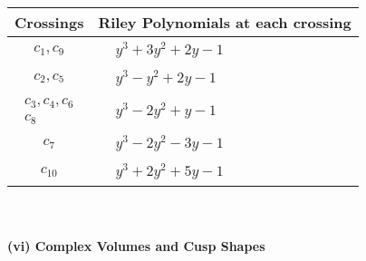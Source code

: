 \documentclass[1p]{elsarticle_modified}
\theoremstyle{definition}
\begin{document}
\begin{tabular}{m{50pt}|m{274pt}}
Crossings & \hspace{64pt}Riley Polynomials at each crossing \\
\hline $$\begin{aligned}c_{1},c_{9}\end{aligned}$$&$\begin{aligned}
&y^3+3 y^2+2 y-1
\end{aligned}$\\
\hline $$\begin{aligned}c_{2},c_{5}\end{aligned}$$&$\begin{aligned}
&y^3- y^2+2 y-1
\end{aligned}$\\
\hline $$\begin{aligned}c_{3},c_{4},c_{6}\\c_{8}\end{aligned}$$&$\begin{aligned}
&y^3-2 y^2+y-1
\end{aligned}$\\
\hline $$\begin{aligned}c_{7}\end{aligned}$$&$\begin{aligned}
&y^3-2 y^2-3 y-1
\end{aligned}$\\
\hline $$\begin{aligned}c_{10}\end{aligned}$$&$\begin{aligned}
&y^3+2 y^2+5 y-1
\end{aligned}$\\
\hline
\end{tabular}\\~\\
\newpage\flushleft \textbf{(vi) Complex Volumes and Cusp Shapes}
\end{document}
